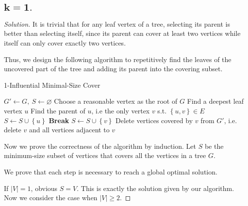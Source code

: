 \documentclass{article}
\newcommand{\set}[1]{\left\{#1\right\}}
\newenvironment{solution}{\begin{proof}[\noindent\it Solution]}{\end{proof}}
\begin{document}
\subsection{$\boldsymbol{k=1}.$}
\vspace{1em}
\begin{solution}
    It is trivial that for any leaf vertex of a tree, selecting its parent is better than selecting itself, since its parent can cover at least two vertices while itself can only cover exactly two vertices.
    
    \hspace{2.6em}
    Thus, we design the following algorithm to repetitively find the leaves of the uncovered part of the tree and adding its parent into the covering subset.
    
    
    \begin{algorithm}
        \caption{1-Influential Minimal-Size Cover}
        
	    {
	        $G'\gets G,\ S\gets \varnothing$\;
	        Choose a reasonable vertex as the root of $G$\;
	        {
	            Find a deepest leaf vertex $u$\;
	            Find the parent of $u$, i.e the only vertex $v$ s.t. $\set{u,v}\in E$\;
	            {$S\gets S\cup \set{u}$\; \textbf{Break}\;}
	            $S\gets S\cup \set{v}$\;
	            Delete vertices covered by $v$ from $G'$, i.e. delete $v$ and all vertices adjacent to $v$\;
	        }
	   }
    \end{algorithm}
    
    \hspace{2.6em}
    Now we prove the correctness of the algorithm by induction. Let $S$ be the minimum-size subset of vertices that covers all the vertices in a tree $G$.
    
    \vspace{1em}
    \hspace{2.6em}
    We prove that each step is necessary to reach a global optimal solution.
    
    \hspace{2.6em}
    If $|V|=1$, obvious $S=V$. This is exactly the solution given by our algorithm. Now we consider the case when $|V|\geq 2$.
    

\end{solution}
\end{document}
